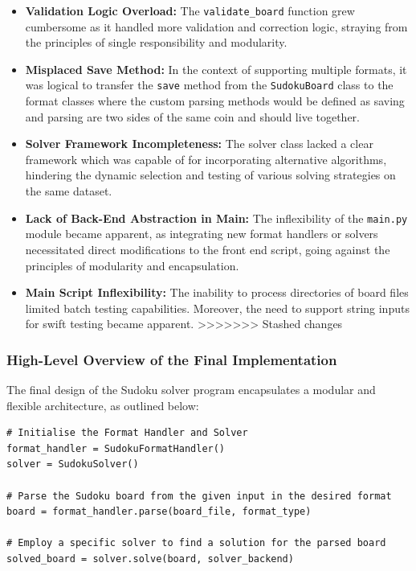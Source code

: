 \documentclass[11pt]{article}
\begin{document}
\begin{itemize}
\begin{itemize}
\item \textbf{Validation Logic Overload:} The \texttt{validate\_board} function grew cumbersome as it handled more validation and correction logic, straying from the principles of single responsibility and modularity.

\item \textbf{Misplaced Save Method:} In the context of supporting multiple formats, it was logical to transfer the \texttt{save} method from the \texttt{SudokuBoard} class to the format classes where the custom parsing methods would be defined as saving and parsing are two sides of the same coin and should live together.

\item \textbf{Solver Framework Incompleteness:} The solver class lacked a clear framework which was capable of for incorporating alternative algorithms, hindering the dynamic selection and testing of various solving strategies on the same dataset.

\item \textbf{Lack of Back-End Abstraction in Main:} The inflexibility of the \texttt{main.py} module became apparent, as integrating new format handlers or solvers necessitated direct modifications to the front end script, going against the principles of modularity and encapsulation.

\item \textbf{Main Script Inflexibility:} The inability to process directories of board files limited batch testing capabilities. Moreover, the need to support string inputs for swift testing became apparent. 
>>>>>>> Stashed changes
\end{itemize}

\subsubsection{High-Level Overview of the Final Implementation}
The final design of the Sudoku solver program encapsulates a modular and flexible architecture, as outlined below:

\begin{verbatim}
# Initialise the Format Handler and Solver
format_handler = SudokuFormatHandler()
solver = SudokuSolver()

# Parse the Sudoku board from the given input in the desired format
board = format_handler.parse(board_file, format_type)

# Employ a specific solver to find a solution for the parsed board 
solved_board = solver.solve(board, solver_backend)


\end{verbatim}
\end{itemize}
\end{document}
